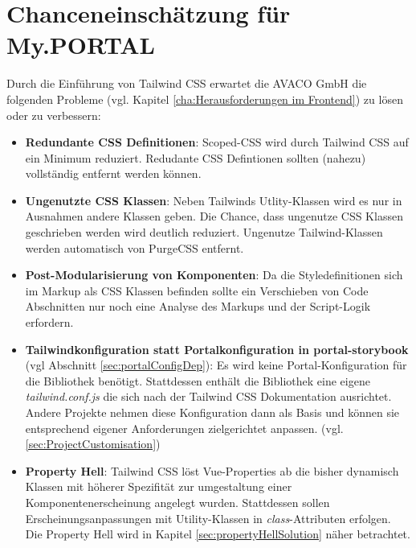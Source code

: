 \section{Chanceneinschätzung für My.PORTAL}
\label{sec:Chanceneinschtzung}
Durch die Einführung von Tailwind CSS erwartet die AVACO GmbH die folgenden Probleme (vgl. Kapitel \ref{cha:Herausforderungen im Frontend}) zu lösen oder zu verbessern:

\begin{itemize}
  \item \textbf{Redundante CSS Definitionen}: Scoped-CSS wird durch Tailwind CSS auf ein Minimum reduziert. Redudante CSS Defintionen sollten (nahezu) vollständig entfernt werden können.
  \item \textbf{Ungenutzte CSS Klassen}: Neben Tailwinds Utlity-Klassen wird es nur in Ausnahmen andere Klassen geben. Die Chance, dass ungenutze CSS Klassen geschrieben werden wird deutlich reduziert. Ungenutze Tailwind-Klassen werden automatisch von PurgeCSS entfernt.
  \item \textbf{Post-Modularisierung von Komponenten}: Da die Styledefinitionen sich im Markup als CSS Klassen befinden sollte ein Verschieben von Code Abschnitten nur noch eine Analyse des Markups und der Script-Logik erfordern.
  \item \textbf{Tailwindkonfiguration statt Portalkonfiguration in portal-storybook} (vgl Abschnitt \ref{sec:portalConfigDep}): Es wird keine Portal-Konfiguration für die Bibliothek benötigt. Stattdessen enthält die Bibliothek eine eigene \textit{tailwind.conf.js} die sich nach der Tailwind CSS Dokumentation ausrichtet. Andere Projekte nehmen diese Konfiguration dann als Basis und können sie entsprechend eigener Anforderungen zielgerichtet anpassen. (vgl. \ref{sec:ProjectCustomisation})
  \item \textbf{Property Hell}: Tailwind CSS löst Vue-Properties ab die bisher dynamisch Klassen mit höherer Spezifität zur umgestaltung einer Komponentenerscheinung angelegt wurden. Stattdessen sollen Erscheinungsanpassungen mit Utility-Klassen in \textit{class}-Attributen erfolgen. Die Property Hell wird in Kapitel \ref{sec:propertyHellSolution} näher betrachtet.
\end{itemize}


